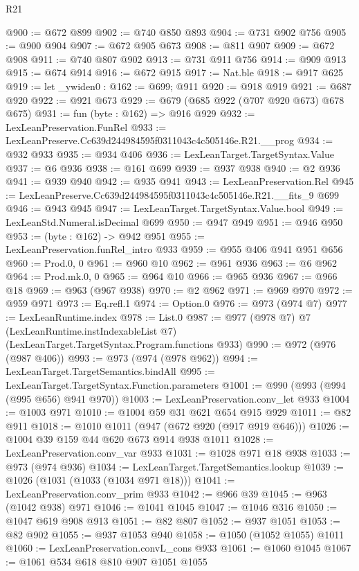 \begin{lexlean}{R21}
\begin{coremodule}
@900 := @672 @899
@902 := @740 @850 @893
@904 := @731 @902 @756
@905 := @900 @904
@907 := @672 @905 @673
@908 := @811 @907
@909 := @672 @908
@911 := @740 @807 @902
@913 := @731 @911 @756
@914 := @909 @913
@915 := @674 @914
@916 := @672 @915
@917 := Nat.ble
@918 := @917 @625
@919 := let _ywiden0 : @162 := @699; @911
@920 := @918 @919
@921 := @687 @920
@922 := @921 @673
@929 := @679 (@685 @922 (@707 @920 @673) @678 @675)
@931 := fun (byte : @162) => @916 @929
@932 := LexLeanPreservation.FunRel
@933 := LexLeanPreserve.Cc639d244984595f0311043c4c505146e.R21.__prog
@934 := @932 @933
@935 := @934 @406
@936 := LexLeanTarget.TargetSyntax.Value
@937 := @6 @936
@938 := @161 @699
@939 := @937 @938
@940 := @2 @936
@941 := @939 @940
@942 := @935 @941
@943 := LexLeanPreservation.Rel
@945 := LexLeanPreserve.Cc639d244984595f0311043c4c505146e.R21.__fits_9 @699
@946 := @943 @945
@947 := LexLeanTarget.TargetSyntax.Value.bool
@949 := LexLeanStd.Numeral.isDecimal @699
@950 := @947 @949
@951 := @946 @950
@953 := (byte : @162) -> @942 @951
@955 := LexLeanPreservation.funRel_intro @933
@959 := @955 @406 @941 @951 @656
@960 := Prod.{0, 0}
@961 := @960 @10
@962 := @961 @936
@963 := @6 @962
@964 := Prod.mk.{0, 0}
@965 := @964 @10
@966 := @965 @936
@967 := @966 @18
@969 := @963 (@967 @938)
@970 := @2 @962
@971 := @969 @970
@972 := @959 @971
@973 := Eq.refl.{1}
@974 := Option.{0}
@976 := @973 (@974 @7)
@977 := LexLeanRuntime.index
@978 := List.{0}
@987 := @977
    (@978 @7)
    @7
    (LexLeanRuntime.instIndexableList @7)
    (LexLeanTarget.TargetSyntax.Program.functions @933)
@990 := @972 (@976 (@987 @406))
@993 := @973 (@974 (@978 @962))
@994 := LexLeanTarget.TargetSemantics.bindAll
@995 := LexLeanTarget.TargetSyntax.Function.parameters
@1001 := @990 (@993 (@994 (@995 @656) @941 @970))
@1003 := LexLeanPreservation.conv_let @933
@1004 := @1003 @971
@1010 := @1004 @59 @31 @621 @654 @915 @929
@1011 := @82 @911
@1018 := @1010 @1011 (@947 (@672 @920 (@917 @919 @646)))
@1026 := @1004 @39 @159 @44 @620 @673 @914 @938 @1011
@1028 := LexLeanPreservation.conv_var @933
@1031 := @1028 @971 @18 @938
@1033 := @973 (@974 @936)
@1034 := LexLeanTarget.TargetSemantics.lookup
@1039 := @1026 (@1031 (@1033 (@1034 @971 @18)))
@1041 := LexLeanPreservation.conv_prim @933
@1042 := @966 @39
@1045 := @963 (@1042 @938) @971
@1046 := @1041 @1045
@1047 := @1046 @316
@1050 := @1047 @619 @908 @913
@1051 := @82 @807
@1052 := @937 @1051
@1053 := @82 @902
@1055 := @937 @1053 @940
@1058 := @1050 (@1052 @1055) @1011
@1060 := LexLeanPreservation.convL_cons @933
@1061 := @1060 @1045
@1067 := @1061 @534 @618 @810 @907 @1051 @1055

\end{coremodule}
\end{lexlean}
